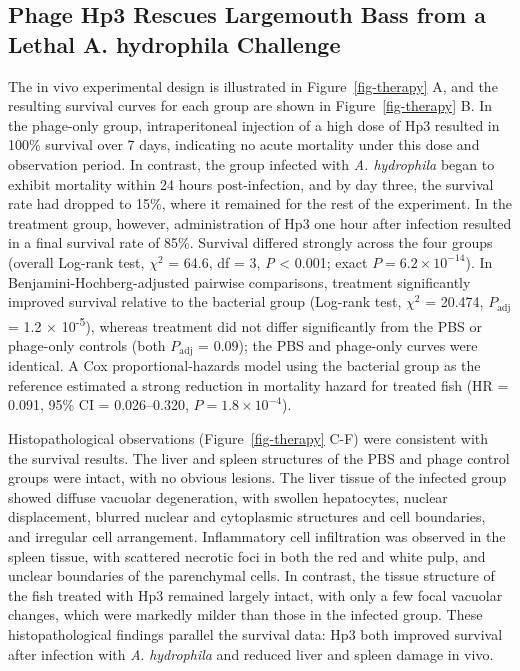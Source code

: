 \subsection{Phage Hp3 Rescues Largemouth Bass from a Lethal A.
hydrophila
Challenge}\label{phage-hp3-rescues-largemouth-bass-from-a-lethal-a.-hydrophila-challenge}

The in vivo experimental design is illustrated in
Figure~\ref{fig-therapy} A, and the resulting survival curves for each
group are shown in Figure~\ref{fig-therapy} B. In the phage-only group,
intraperitoneal injection of a high dose of Hp3 resulted in 100\%
survival over 7 days, indicating no acute mortality under this dose
and observation period. In contrast, the group infected with
\emph{A. hydrophila} began to exhibit mortality within 24 hours
post-infection, and by day three, the survival rate had dropped to
15\%, where it remained for the rest of the experiment. In the treatment
group, however, administration of Hp3 one hour after infection resulted
in a final survival rate of 85\%. Survival differed strongly across the
four groups (overall Log-rank test, \(\chi^2\) = 64.6, df = 3,
\textit{P} \textless{} 0.001; exact \(P = 6.2 \times 10^{-14}\)). In
Benjamini-Hochberg-adjusted pairwise comparisons, treatment significantly
improved survival relative to the bacterial group (Log-rank test,
\(\chi^2\) = 20.474, \(P_{\mathrm{adj}}\) = 1.2 ×
10\textsuperscript{-5}), whereas treatment did not differ significantly
from the PBS or phage-only controls (both \(P_{\mathrm{adj}}\) = 0.09);
the PBS and phage-only curves were identical. A Cox proportional-hazards
model using the bacterial group as the reference estimated a strong
reduction in mortality hazard for treated fish (HR = 0.091, 95\% CI =
0.026--0.320, \(P = 1.8 \times 10^{-4}\)).

Histopathological observations (Figure~\ref{fig-therapy} C-F) were
consistent with the survival results. The liver and spleen structures of
the PBS and phage control groups were intact, with no obvious lesions.
The liver tissue of the infected group showed diffuse vacuolar
degeneration, with swollen hepatocytes, nuclear displacement, blurred
nuclear and cytoplasmic structures and cell boundaries, and irregular
cell arrangement. Inflammatory cell infiltration was observed in the
spleen tissue, with scattered necrotic foci in both the red and white
pulp, and unclear boundaries of the parenchymal cells. In contrast, the
tissue structure of the fish treated with Hp3 remained largely intact,
with only a few focal vacuolar changes, which were markedly milder
than those in the infected group. These histopathological findings
parallel the survival data: Hp3 both improved survival after infection
with \emph{A}. \emph{hydrophila} and reduced liver and spleen damage
in vivo.

